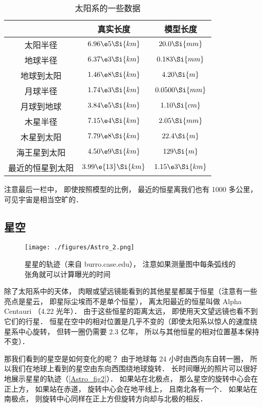 \begin{table}[ht]
\centering
\caption{太阳系的一些数据}\label{Astro_tab1}
\begin{tabular}{|c|c|c|}
\hline
 & 真实长度 & 模型长度 \\
\hline
太阳半径 & $6.96\e5 \Si{km}$ & $20.0 \Si{mm}$\\
\hline
地球半径 &  $6.37\e3 \Si{km}$ & $0.183 \Si{mm}$\\
\hline
地球到太阳  &  $1.46\e8 \Si{km}$ & $4.20 \Si{m}$\\
\hline
月球半径 & $1.74\e3 \Si{km}$ & $0.0500 \Si{mm}$\\
\hline
月球到地球 & $3.84\e5 \Si{km}$ &  $1.10 \Si{cm}$\\
\hline
木星半径 & $7.15\e4 \Si{km}$ & $2.05 \Si{mm}$\\
\hline
木星到太阳 & $7.79\e8 \Si{km}$ & $22.4 \Si{m}$\\
\hline
海王星到太阳 & $4.50\e9 \Si{km}$ & $129 \Si{m}$\\
\hline
最近的恒星到太阳 & $3.99\e{13} \Si{km}$ &  $1.15\e3 \Si{km}$\\
\hline
\end{tabular}
\end{table}
注意最后一栏中， 即使按照模型的比例， 最近的恒星离我们也有 1000 多公里， 可见宇宙是相当空旷的．

\subsection{星空}

\begin{figure}[ht]
\centering
\texttt{[image: ./figures/Astro\_2.png]}
\caption{星星的轨迹（来自 burro.case.edu）， 注意如果测量图中每条弧线的张角就可以计算曝光的时间} \label{Astro_fig2}
\end{figure}

除了太阳系中的天体， 肉眼或望远镜能看到的其他星星都属于恒星（注意有一些亮点是星云， 即星际尘埃而不是单个恒星）， 离太阳最近的恒星叫做 Alpha Centauri （4.22 光年）． 由于这些恒星的距离太远， 即使用天文望远镜也看不到它们的行星． 恒星在空中的相对位置是几乎不变的（即使太阳系以惊人的速度绕星系中心旋转， 但转一圈仍需要 2.3 亿年， 所以与其他恒星的相对位置基本保持不变）．

那我们看到的星空是如何变化的呢？ 由于地球每 24 小时由西向东自转一圈， 所以我们在地球上看到的星空由东向西围绕地球旋转． 长时间曝光的照片可以很好地展示星星的轨迹（\autoref{Astro_fig2}）． 如果站在北极点， 那么星空的旋转中心会在正上方， 如果站在赤道， 旋转中心会在地平线上， 且南北各有一个． 如果站在南极点， 则旋转中心同样在正上方但旋转方向却与北极的相反．

